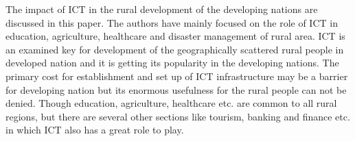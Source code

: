 \documentclass[12pt]{homework}
\begin{document}
The impact of ICT in the rural development of the developing nations are discussed in this paper. The authors have mainly focused on the role of ICT in education, agriculture, healthcare and disaster management of rural area. ICT is an examined key for development of the geographically scattered rural people in developed nation and it is getting its popularity in the developing nations. The primary cost for establishment and set up of ICT infrastructure may be a barrier for developing nation but its enormous usefulness for the rural people can not be denied. Though education, agriculture, healthcare etc. are common to all rural regions, but there are several other sections like tourism, banking and finance etc. in which ICT also has a great role to play.\\






 
\end{document}
